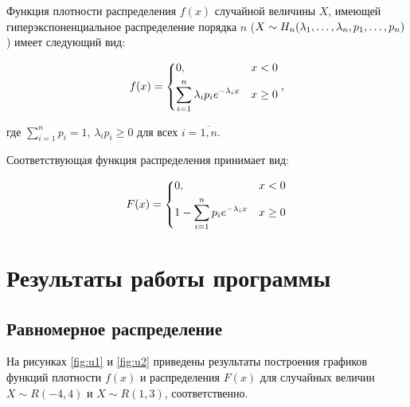 \documentclass[14pt, a4paper]{extarticle}
\begin{document}
 Функция плотности распределения $f(x)$ случайной величины $X$, имеющей гиперэкспоненциальное распределение порядка $n$ ($X \sim H_n(\lambda_1, \dots, \lambda_n,\\ p_1, \dots, p_n)$) имеет следующий вид:

\begin{equation}
	f(x) = \begin{dcases}
		0, & x < 0\\
		\sum_{i=1}^{n}\lambda_ip_ie^{-\lambda_ix} & x \ge 0\\
	\end{dcases},
\end{equation}


где $\sum_{i=1}^np_i = 1$, $\lambda_ip_i \ge 0$ для всех $i=\overline{1, n}$.

Соответствующая функция распределения принимает вид:

\begin{equation}
	F(x)= \begin{dcases}
		0, & x < 0\\
		1-\sum_{i=1}^{n}p_ie^{-\lambda_ix} & x \ge 0\\
		\end{dcases}
\end{equation}

\section{Результаты работы программы}


\subsection{Равномерное распределение}

На рисунках \ref{fig:u1} и \ref{fig:u2} приведены результаты построения графиков функций плотности $f(x)$ и распределения $F(x)$ для случайных величин $X \sim R(-4, 4)$ и $X \sim R(1, 3)$, соответственно.
\end{document}

